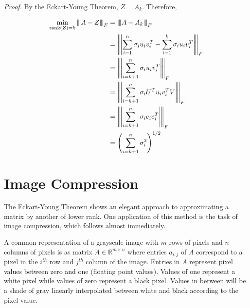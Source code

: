 \documentclass[a4paper]{article}
\newcommand{\norm}[1]{{\left\vert\kern-0.25ex\left\vert\kern-0.25ex\left\vert #1 
    \right\vert\kern-0.25ex\right\vert\kern-0.25ex\right\vert}}
\newcommand{\rank}[1]{\text{rank}(#1)}
\begin{document}
\textit{Proof.}
By the Eckart-Young Theorem, $Z=A_k$. Therefore, 

\begin{align*}
\min_{\rank{Z}=k}\norm{A-Z}_F &= \norm{A-A_k}_F\\
&= \norm{\sum_{i=1}^n \sigma_iu_iv_i^T - \sum_{i=1}^k \sigma_iu_iv_i^T}_F\\
&= \norm{\sum_{i=k+1}^n \sigma_iu_iv_i^T}_F\\
&= \norm{\sum_{i=k+1}^n \sigma_i U^T u_iv_i^T V}_F\\
&= \norm{\sum_{i=k+1}^n \sigma_ie_ie_i^T}_F\\
&= \left( \sum_{i=k+1}^n \sigma_i^2 \right)^{1/2}
\end{align*}









\section{Image Compression}

The Eckart-Young Theorem shows an elegant approach to approximating a matrix by another of lower rank.  One application of this method is the task of image compression, which follows almost immediately.

A common representation of a grayscale image with $m$ rows of pixels and $n$ columns of pixels is as matrix $A\in \mathbb{R}^{m\times n}$ where entries $a_{i,j}$ of $A$ correspond to a pixel in the $i^{th}$ row and $j^{th}$ column of the image.  Entries in $A$ represent pixel values between zero and one (floating point values).  Values of one represent a white pixel while values of zero represent a black pixel.  Values in between will be a shade of gray linearly interpolated between white and black according to the pixel value.
\end{document}
